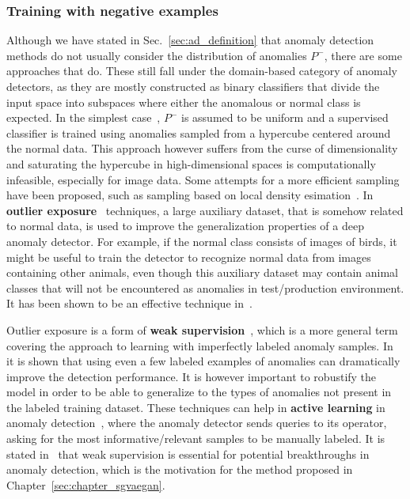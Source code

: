 \subsubsection{Training with negative examples}
Although we have stated in Sec.~\ref{sec:ad_definition} that anomaly detection methods do not usually consider the distribution of anomalies $P^-$, there are some approaches that do. These still fall under the domain-based category of anomaly detectors, as they are mostly constructed as binary classifiers that divide the input space into subspaces where either the anomalous or normal class is expected. In the simplest case~\cite{steinwart2005classification}, $P^-$ is assumed to be uniform and a supervised classifier is trained using anomalies sampled from a hypercube centered around the normal data. This approach however suffers from the curse of dimensionality and saturating the hypercube in high-dimensional spaces is computationally infeasible, especially for image data. Some attempts for a more efficient sampling have been proposed, such as sampling based on local density esimation~\cite{fan2004using}. In \textbf{outlier exposure}~\cite{hendrycksDeepAnomalyDetection2019} techniques, a large auxiliary dataset, that is somehow related to normal data, is used to improve the generalization properties of a deep anomaly detector. For example, if the normal class consists of images of birds, it might be useful to train the detector to recognize normal data from images containing other animals, even though this auxiliary dataset may contain animal classes that will not be encountered as anomalies in test/production environment. It has been shown to be an effective technique in~\cite{hendrycks2019using}.  

Outlier exposure is a form of \textbf{weak supervision}~\cite{zhou2018brief}, which is a more general term covering the approach to learning with imperfectly labeled anomaly samples. In~\cite{ruff2019deep,liznerski2020explainable} it is shown that using even a few labeled examples of anomalies can dramatically improve the detection performance. It is however important to robustify the model in order to be able to generalize to the types of anomalies not present in the labeled training dataset. These techniques can help in \textbf{active learning} in anomaly detection~\cite{abe2006outlier}, where the anomaly detector sends queries to its operator, asking for the most informative/relevant samples to be manually labeled. It is stated in~\cite{ruff2020unifying} that weak supervision is essential for potential breakthroughs in anomaly detection, which is the motivation for the method proposed in Chapter~\ref{sec:chapter_sgvaegan}.

